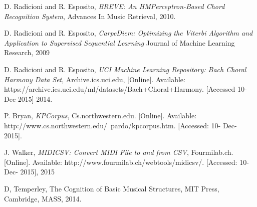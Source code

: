 \documentclass{article} %
\begin{document}
\begin{thebibliography}{9}

  D. Radicioni and R. Esposito,
  \emph{BREVE: An HMPerceptron-Based Chord Recognition System},
  Advances In Music Retrieval,
  2010.


  D. Radicioni and R. Esposito,
  \emph{CarpeDiem: Optimizing the Viterbi Algorithm and Application to Supervised Sequential Learning}
  Journal of Machine Learning Research,
  2009

  D. Radicioni and R. Esposito,
  \emph{UCI Machine Learning Repository: Bach Choral Harmony Data Set},
  Archive.ics.uci.edu,
  [Online]. Available: https://archive.ics.uci.edu/ml/datasets/Bach+Choral+Harmony. [Accessed 10-Dec-2015]
  2014.


  P. Bryan,
  \emph{KPCorpus},
  Cs.northwestern.edu. [Online]. Available: http://www.cs.northwestern.edu/~pardo/kpcorpus.htm. [Accessed: 10- Dec- 2015].


  J. Walker,
  \emph{MIDICSV: Convert MIDI File to and from CSV},
  Fourmilab.ch. [Online]. Available: http://www.fourmilab.ch/webtools/midicsv/. [Accessed: 10- Dec- 2015],
  2015

  D, Temperley,
  The Cognition of Basic Musical Structures,
  MIT Press, Cambridge, MASS,
  2014.

\end{thebibliography}
\end{document}
